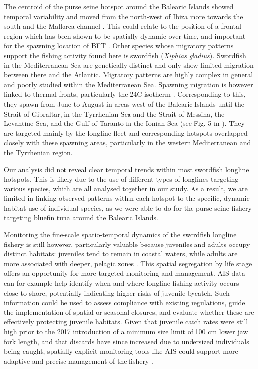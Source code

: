 \medskip

The centroid of the purse seine hotspot around the Balearic Islands showed temporal variability and
moved from the north-west of Ibiza more towards the south and the Mallorca channel
. This could relate to the position of a frontal region which has been shown
to be spatially dynamic over time, and important for the spawning location of BFT
\citep{balbin_14,reglero_12}. Other species whose migratory patterns support the fishing activity
found here is swordfish (\textit{Xiphias gladius}). Swordfish in the Mediterranean Sea are
genetically distinct and only show limited migration between there and the Atlantic. Migratory
patterns are highly complex in general and poorly studied within the Mediterranean Sea. Spawning
migration is however linked to thermal fronts, particularly the 24\textdegree C isotherm
\citep{palko1981swordfish,arocha_2007}. Corresponding to this, they spawn from June to August in
areas west of the Balearic Islands until the Strait of Gibraltar, in the Tyrrhenian Sea and the
Strait of Messina, the Levantine Sea, and the Gulf of Taranto in the Ionian Sea (see Fig. 5 in
\citealp{arocha_2007}). They are targeted mainly by the longline fleet and corresponding hotspots
overlapped closely with these spawning areas, particularly in the western Mediterranean and the
Tyrrhenian region.

\medskip

Our analysis did not reveal clear temporal trends within most swordfish longline hotspots. This is
likely due to the use of different types of longlines targeting various species, which are all
analysed together in our study. As a result, we are limited in linking observed patterns within
each hotspot to the specific, dynamic habitat use of individual species, as we were able to do for
the purse seine fishery targeting bluefin tuna around the Balearic Islands.

\medskip

Monitoring the fine-scale spatio-temporal dynamics of the swordfish longline fishery is still
however, particularly valuable because juveniles and adults occupy distinct habitats: juveniles
tend to remain in coastal waters, while adults are more associated with deeper, pelagic zones
\citep{damalas_14_swo}. This spatial segregation by life stage offers an opportunity for more
targeted monitoring and management. AIS data can for example help identify when and where longline
fishing activity occurs close to shore, potentially indicating higher risks of juvenile bycatch.
Such information could be used to assess compliance with existing regulations, guide the
implementation of spatial or seasonal closures, and evaluate whether these are effectively
protecting juvenile habitats. Given that juvenile catch rates were still high prior to the 2017
introduction of a minimum size limit of 100 cm lower jaw fork length, and that discards have since
increased due to undersized individuals being caught, spatially explicit monitoring tools like AIS
could support more adaptive and precise management of the fishery
\citep{iccat_juvenile_catches_swo,iccat_juvenile_swo_ortiz,iccat_swo_discards}.

